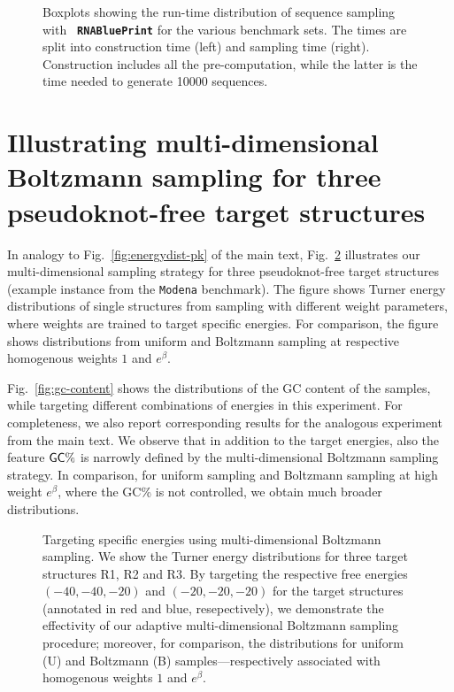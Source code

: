 \documentclass[10pt]{article}
\makeatletter
\newlength{\@aligneps}
\newcommand{\includegraphicstop}[2][]{%
\sbox{\@alignepsbox}{\texttt{[image: \#2]}}%
\setlength{\@aligneps}{-\ht\@alignepsbox}%
\addtolength{\@aligneps}{2ex}%
\raisebox{\@aligneps}{\usebox{\@alignepsbox}}}
\newcommand{\Nuc}[1]{{\sf #1}}
\newcommand{\Cb}{\Nuc{C}}
\newcommand{\Gb}{\Nuc{G}}
\newcommand{\GCb}{\Gb\Cb}
\newcommand{\RNAblueprint}{{\tt \bfseries{}\color{black!85} RNA\textcolor{blue!70!black}{Blue}Print}}
\newenvironment{revision}{\color{red}}{\color{black}}
\makeatother
\begin{document}
\begin{revision}
\begin{figure}[h!]
  \caption{Boxplots showing the run-time distribution of sequence sampling with \RNAblueprint{} for the various benchmark sets. The times are split into construction time (left) and sampling time (right). Construction includes all the pre-computation, while the latter is the time needed to generate 10000 sequences.}
  \label{fig:run-times-rbp}
\end{figure}

\end{revision}

\section{Illustrating multi-dimensional Boltzmann sampling for three pseudoknot-free target structures}

    In analogy to Fig.~\ref{fig:energydist-pk} of the main text,
    Fig.~\ref{fig:energydist} illustrates our multi-dimensional sampling
    strategy for three pseudoknot-free target structures (example instance
    from the \texttt{Modena} benchmark). The figure shows Turner energy
    distributions of single structures from sampling with different weight
    parameters, where weights are trained to target specific energies. For
    comparison, the figure shows distributions from uniform and Boltzmann
    sampling at respective homogenous weights $1$ and $e^\beta$.

    Fig.~\ref{fig:gc-content} shows the distributions of the GC content of the samples, while targeting different combinations of energies in this experiment. For completeness, we also report corresponding results for the analogous experiment from the main text. We observe that in addition to the target energies, also the feature $\GCb\%$ is narrowly defined by the multi-dimensional Boltzmann sampling strategy. In comparison, for uniform sampling and Boltzmann sampling at high weight $e^\beta$, where the \GCb\% is not controlled, we obtain much broader distributions. 

\begin{figure}[h!]
      \begin{center}
        \includegraphicstop[width=0.8\textwidth]{Figs/energy_distribution}
      \end{center}
      \caption{%
        Targeting specific energies using multi-dimensional Boltzmann
        sampling. We show the Turner energy distributions for
        three target structures R1, R2 and R3. By
        targeting the respective free energies $(-40,-40,-20)$ and
        $(-20,-20,-20)$ for the target structures (annotated in red and
        blue, resepectively), we demonstrate the
        effectivity of our adaptive multi-dimensional Boltzmann sampling
        procedure; moreover, for comparison, the distributions for uniform
        (U) and Boltzmann (B) samples---respectively associated with
        homogenous weights $1$ and $e^\beta$.
  }
  \label{fig:energydist}
\end{figure}
\end{document}
